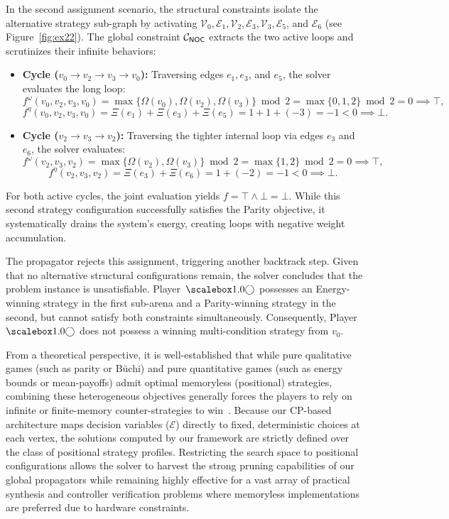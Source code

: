 \documentclass[a4paper,fleqn]{cas-sc}
\begin{document}
In the second assignment scenario, the structural constraints isolate the alternative strategy sub-graph by activating $\mathcal{V}_0, \mathcal{E}_1, \mathcal{V}_2, \mathcal{E}_3, \mathcal{V}_3, \mathcal{E}_5$, and $\mathcal{E}_6$ (see Figure~\ref{fig:ex22}). The global constraint $\mathcal{C}_{{\textsf{NOC}}}$ extracts the two active loops and scrutinizes their infinite behaviors:
\begin{itemize}
    \item \textbf{Cycle ($v_0 \rightarrow v_2 \rightarrow v_3 \rightarrow v_0$):} Traversing edges $e_1, e_3$, and $e_5$, the solver evaluates the long loop:
    \[
    f^\mathcal{\omega}(v_0, v_2, v_3, v_0) = \max\{\Omega(v_0), \Omega(v_2), \Omega(v_3)\} \bmod 2 = \max\{0, 1, 2\} \bmod 2 = 0 \implies \top,
    \]
    \[
    f^\mathcal{\eta}(v_0, v_2, v_3, v_0) = \Xi(e_1) + \Xi(e_3) + \Xi(e_5) = 1 + 1 + (-3) = -1 < 0 \implies \bot.
    \]
    \item \textbf{Cycle ($v_2 \rightarrow v_3 \rightarrow v_2$):} Traversing the tighter internal loop via edges $e_3$ and $e_6$, the solver evaluates:
    \[
    f^\mathcal{\omega}(v_2, v_3, v_2) = \max\{\Omega(v_2), \Omega(v_3)\} \bmod 2 = \max\{1, 2\} \bmod 2 = 0 \implies \top,
    \]
    \[
    f^\mathcal{\eta}(v_2, v_3, v_2) = \Xi(e_3) + \Xi(e_6) = 1 + (-2) = -1 < 0 \implies \bot.
    \]
\end{itemize}
For both active cycles, the joint evaluation yields $f = \top \land \bot = \bot$. While this second strategy configuration successfully satisfies the Parity objective, it systematically drains the system's energy, creating loops with negative weight accumulation. 

The propagator rejects this assignment, triggering another backtrack step. Given that no alternative structural configurations remain, the solver concludes that the problem instance is unsatisfiable. Player~$\even$ possesses an Energy-winning strategy in the first sub-arena and a Parity-winning strategy in the second, but cannot satisfy both constraints simultaneously. Consequently, Player~$\even$ does not possess a winning multi-condition strategy from $v_0$.






From a theoretical perspective, it is well-established that while pure qualitative games (such as parity or Büchi) and pure quantitative games (such as energy bounds or mean-payoffs) admit optimal memoryless (positional) strategies, combining these heterogeneous objectives generally forces the players to rely on infinite or finite-memory counter-strategies to win~\cite{ChatterjeeHJ05,Chatterjee:2010}. Because our CP-based architecture maps decision variables ($\mathcal{E}$) directly to fixed, deterministic choices at each vertex, the solutions computed by our framework are strictly defined over the class of positional strategy profiles. Restricting the search space to positional configurations allows the solver to harvest the strong pruning capabilities of our global propagators while remaining highly effective for a vast array of practical synthesis and controller verification problems where memoryless implementations are preferred due to hardware constraints.
\end{document}
